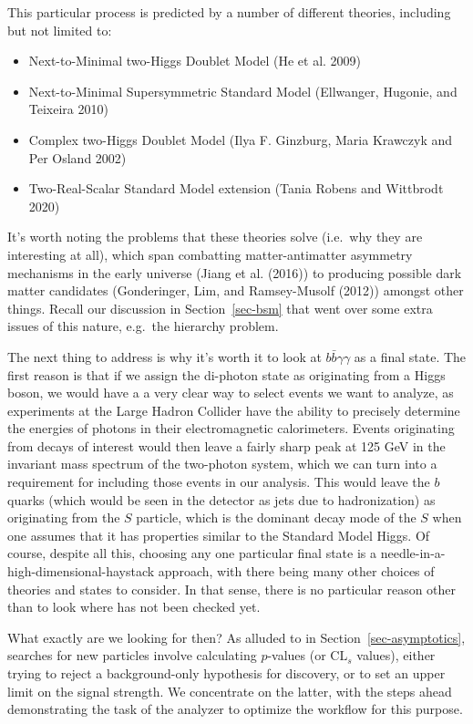 \documentclass[
  11pt,
  numbers=noendperiod]{book}
\providecommand{\tightlist}{%
  \setlength{\itemsep}{0pt}\setlength{\parskip}{0pt}}\usepackage{longtable,booktabs,array}
\begin{document}
This particular process is predicted by a number of different theories,
including but not limited to:

\begin{itemize}
\tightlist
\item
  Next-to-Minimal two-Higgs Doublet Model (He et al. 2009)
\item
  Next-to-Minimal Supersymmetric Standard Model (Ellwanger, Hugonie, and
  Teixeira 2010)
\item
  Complex two-Higgs Doublet Model (Ilya F. Ginzburg, Maria Krawczyk and
  Per Osland 2002)
\item
  Two-Real-Scalar Standard Model extension (Tania Robens and Wittbrodt
  2020)
\end{itemize}

It's worth noting the problems that these theories solve (i.e.~why they
are interesting at all), which span combatting matter-antimatter
asymmetry mechanisms in the early universe (Jiang et al. (2016)) to
producing possible dark matter candidates (Gonderinger, Lim, and
Ramsey-Musolf (2012)) amongst other things. Recall our discussion in
Section~\ref{sec-bsm} that went over some extra issues of this nature,
e.g.~the hierarchy problem.

The next thing to address is why it's worth it to look at
\(b\bar{b}\gamma\gamma\) as a final state. The first reason is that if
we assign the di-photon state as originating from a Higgs boson, we
would have a a very clear way to select events we want to analyze, as
experiments at the Large Hadron Collider have the ability to precisely
determine the energies of photons in their electromagnetic calorimeters.
Events originating from decays of interest would then leave a fairly
sharp peak at 125 GeV in the invariant mass spectrum of the two-photon
system, which we can turn into a requirement for including those events
in our analysis. This would leave the \(b\) quarks (which would be seen
in the detector as jets due to hadronization) as originating from the
\(S\) particle, which is the dominant decay mode of the \(S\) when one
assumes that it has properties similar to the Standard Model Higgs. Of
course, despite all this, choosing any one particular final state is a
needle-in-a-high-dimensional-haystack approach, with there being many
other choices of theories and states to consider. In that sense, there
is no particular reason other than to look where has not been checked
yet.

What exactly are we looking for then? As alluded to in
Section~\ref{sec-asymptotics}, searches for new particles involve
calculating \(p\)-values (or \(\text{CL}_s\) values), either trying to
reject a background-only hypothesis for discovery, or to set an upper
limit on the signal strength. We concentrate on the latter, with the
steps ahead demonstrating the task of the analyzer to optimize the
workflow for this purpose.
\end{document}
